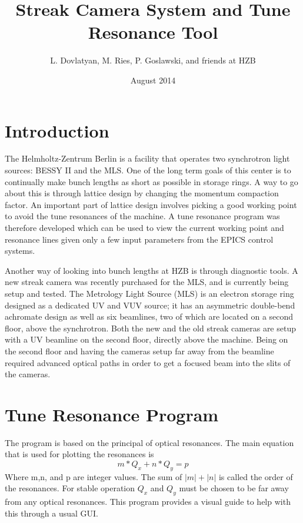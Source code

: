 \documentclass[%
 reprint,%
 amssymb, amsmath,%
 aip,cha,%
]{revtex4-1}
\begin{document}
\title{Streak Camera System and Tune Resonance Tool}%

\author{L. Dovlatyan, M. Ries, P. Goslawski, and friends at HZB}%
%

\date{August 2014}%

\maketitle

\tableofcontents

\section{Introduction}

The Helmholtz-Zentrum Berlin is a facility that operates two synchrotron light sources: BESSY II and the MLS. One of the long term goals of this center is to continually make bunch lengths as short as possible in storage rings. A way to go about this is through lattice design by changing the momentum compaction factor. An important part of lattice design involves picking a good working point to avoid the tune resonances of the machine. A tune resonance program was therefore developed which can be used to view the current working point and resonance lines given only a few input parameters from the EPICS control systems.

Another way of looking into bunch lengths at HZB is through diagnostic tools. A new streak camera was recently purchased for the MLS, and is currently being setup and tested. The Metrology Light Source (MLS) is an electron storage ring designed as a dedicated UV and VUV source; it has an asymmetric double-bend achromate design as well as six beamlines, two of which are located on a second floor, above the synchrotron. Both the new and the old streak cameras are setup with a UV beamline on the second floor, directly above the machine. Being on the second floor and having the cameras setup far away from the beamline required advanced optical paths in order to get a focused beam into the slits of the cameras.

\section{Tune Resonance Program\cite{Note1}}

The program is based on the principal of optical resonances. The main equation that is used for plotting the resonances is
\begin{equation}
 m*Q_x + n*Q_y = p
\end{equation}
Where m,n, and p are integer values. The sum of $ |m| + |n| $ is called the order of the resonances. For stable operation $Q_x$ and $Q_y$ must be chosen to be far away from any optical resonances. This program provides a visual guide to help with this through a usual GUI.
\end{document}
